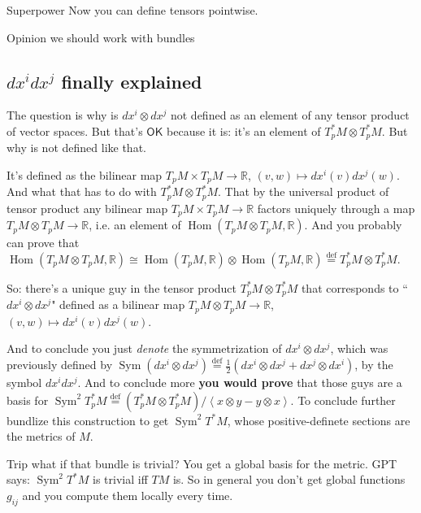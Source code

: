 \begin{thing8}{Superpower}\leavevmode
Now you can define tensors pointwise.
\end{thing8}

\begin{thing6}{Opinion}\leavevmode
we should work with bundles
\end{thing6}

\subsection{\(dx^idx^j\) finally explained}

The question is why is \(dx^i  \otimes dx^j\) not defined as an element of any tensor product of vector spaces. But that's  $\mathsf{OK}$ because it is: it's an element of \(T_p^*M\otimes T^*_pM\). But why is not defined like that.

It's defined as the bilinear map \(T_pM \times T_pM\to \mathbb{R}\), \((v,w)\mapsto dx^i(v)dx^j(w)\). And what that has to do with \(T_p ^*M\otimes T_p ^*M\). That by the universal product of tensor product any bilinear map \(T_pM \times T_pM\to \mathbb{R}\) factors uniquely through a map \(T_pM \otimes T_pM \to \mathbb{R}\), i.e. an element of \(\operatorname{Hom}(T_pM \otimes T_pM, \mathbb{R})\). And you probably can prove that \(\operatorname{Hom}(T_pM \otimes T_p M, \mathbb{R})\cong \operatorname{Hom}(T_pM,\mathbb{R})\otimes \operatorname{Hom}(T_pM, \mathbb{R})\overset{\operatorname{def}}{=}T_p ^*M \otimes T^*_pM\).

So: there's a unique guy in the tensor product \(T_p ^*M \otimes T^*_pM\) that corresponds to ``\(dx^i \otimes dx^j\)" defined as a bilinear map \(T_pM \otimes T_pM\to \mathbb{R}\), \((v,w)\mapsto dx^i(v)dx^j(w)\).

And to conclude you just \textit{denote} the symmetrization of \(dx^i \otimes dx^j\), which was previously defined by \(\operatorname{Sym}(dx^i \otimes dx^j)\overset{\operatorname{def}}{=}\frac{1}{2}(dx^i \otimes dx^j +dx^j \otimes dx^i)\), by the symbol \(dx^idx^j\). And to conclude more \textbf{you would prove} that those guys are a basis for \(\operatorname{Sym}^2T_p^*M\overset{\operatorname{def}}{=}(T_p^* M \otimes T_p^*M)/\left<x \otimes y-y \otimes x\right>\). To conclude further bundlize this construction to get \(\operatorname{Sym}^2T^*M\), whose positive-definete sections are the metrics of \(M\).

\begin{thing8}{Trip}\leavevmode
what if that bundle is trivial? You get a global basis for the metric. GPT says: \(\operatorname{Sym}^2T^*M\) is trivial iff \(TM\) is. So in general you don't get global functions \(g_{ij}\) and you compute them locally every time.
\end{thing8}

